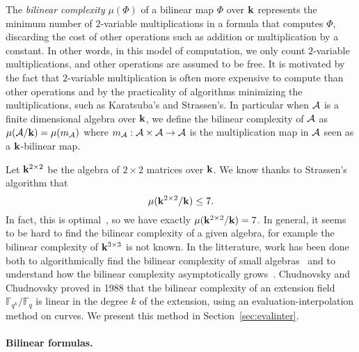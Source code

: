 The \emph{bilinear complexity} $\mu(\Phi)$ of a bilinear map $\Phi$ over $\mathbf{k}$
represents the minimum number of $2$-variable
multiplications in a formula that computes $\Phi$, discarding the cost of other
operations such as addition or multiplication by a constant. In other words, in
this model of computation, we only count $2$-variable multiplications, and other
operations are assumed to be free. It is motivated by the fact that
$2$-variable multiplication is often more expensive to compute than other
operations and by the practicality of algorithms minimizing the multiplications,
such as Karatsuba's and Strassen's.
In particular when $\mathcal{A}$ is a finite dimensional algebra over $\mathbf{k}$,
we define the bilinear complexity of $\mathcal{A}$ as $\mu(\mathcal{A}/\mathbf{k})=\mu(m_{\mathcal{A}})$
where $m_{\mathcal{A}}:\mathcal{A}\times\mathcal{A}\to\mathcal{A}$ is the multiplication map in $\mathcal{A}$ seen
as a $\mathbf{k}$-bilinear map.

Let $\mathbf{k}^{2\times2}$ be the algebra
of $2\times2$ matrices over $\mathbf{k}$. We know thanks to Strassen's algorithm that
\[
  \mu(\mathbf{k}^{2\times 2}/\mathbf{k}) \leq 7.
\]
In fact, this is optimal~\cite[Theorem 3.1]{Winograd71}, so we have exactly $\mu(\mathbf{k}^{2\times2}/\mathbf{k})=7$. In
general, it seems to be hard to find the bilinear complexity of a given algebra,
for example the bilinear complexity of $\mathbf{k}^{3\times3}$ is not known.
In the litterature, work has been done both to algorithmically find the bilinear complexity of
small algebras~\cite{BDEZ12, Covanov19} and to understand how the bilinear
complexity asymptotically grows~\cite{CC88, BCPRRR19}. Chudnovsky and Chudnovsky
proved in 1988 that the bilinear complexity of an extension field
$\mathbb{F}_{q^k}/\mathbb{F}_{q}$ is linear in the degree $k$ of the
extension, using an evaluation-interpolation method on curves. We present this
method in Section~\ref{sec:evalinter}.

\paragraph{Bilinear formulas.}

